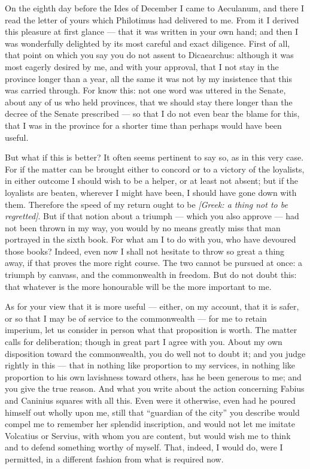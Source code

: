 

 On the eighth day before the Ides of December I came to Aeculanum, and there I read the letter of yours which Philotimus had delivered to me. From it I derived this pleasure at first glance --- that it was written in your own hand; and then I was wonderfully delighted by its most careful and exact diligence. First of all, that point on which you say you do not assent to Dicaearchus: although it was most eagerly desired by me, and with your approval, that I not stay in the province longer than a year, all the same it was not by my insistence that this was carried through. For know this: not one word was uttered in the Senate, about any of us who held provinces, that we should stay there longer than the decree of the Senate prescribed --- so that I do not even bear the blame for this, that I was in the province for a shorter time than perhaps would have been useful.

 But what if this is better? It often seems pertinent to say so, as in this very case. For if the matter can be brought either to concord or to a victory of the loyalists, in either outcome I should wish to be a helper, or at least not absent; but if the loyalists are beaten, wherever I might have been, I should have gone down with them. Therefore the speed of my return ought to be \textit{[Greek: a thing not to be regretted]}. But if that notion about a triumph --- which you also approve --- had not been thrown in my way, you would by no means greatly miss that man portrayed in the sixth book. For what am I to do with you, who have devoured those books? Indeed, even now I shall not hesitate to throw so great a thing away, if that proves the more right course. The two cannot be pursued at once: a triumph by canvass, and the commonwealth in freedom. But do not doubt this: that whatever is the more honourable will be the more important to me.

 As for your view that it is more useful --- either, on my account, that it is safer, or so that I may be of service to the commonwealth --- for me to retain imperium, let us consider in person what that proposition is worth. The matter calls for deliberation; though in great part I agree with you. About my own disposition toward the commonwealth, you do well not to doubt it; and you judge rightly in this --- that in nothing like proportion to my services, in nothing like proportion to his own lavishness toward others, has he been generous to me; and you give the true reason. And what you write about the action concerning Fabius and Caninius squares with all this. Even were it otherwise, even had he poured himself out wholly upon me, still that ``guardian of the city'' you describe would compel me to remember her splendid inscription, and would not let me imitate Volcatius or Servius, with whom you are content, but would wish me to think and to defend something worthy of myself. That, indeed, I would do, were I permitted, in a different fashion from what is required now.

